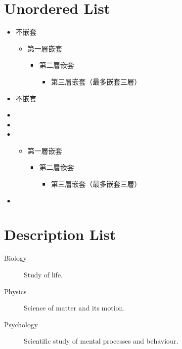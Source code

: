 \section{Unordered List}
\begin{itemize}
  \item 不嵌套
  \begin{itemize}
    \item 第一層嵌套
    \begin{itemize}
      \item 第二層嵌套
      \begin{itemize}
        \item 第三層嵌套（最多嵌套三層）
      \end{itemize}
    \end{itemize}
  \end{itemize}
  \item 不嵌套
\end{itemize}

\begin{itemize}
  \item \blindtext[1]
  \item \blindtext[1]
  \item \blindtext[1]
  \begin{itemize}
    \item 第一層嵌套
    \begin{itemize}
      \item 第二層嵌套
      \begin{itemize}
        \item 第三層嵌套（最多嵌套三層）
      \end{itemize}
    \end{itemize}
  \end{itemize}
  \item \blindtext[1]
\end{itemize}
\section{Description List}
\begin{description}
    \item[Biology] Study of life.
    \item[Physics] Science of matter and its motion.
    \item[Psychology] Scientific study of mental processes and behaviour.
\end{description}

